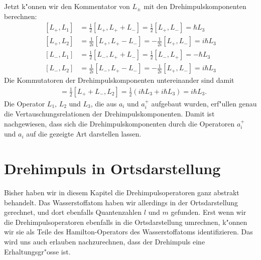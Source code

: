 Jetzt k"onnen wir den Kommentator von $L_\pm$ mit den
Drehimpulskomponenten berechnen:
\begin{align*}
[L_+,L_1]
&=
\frac12[L_+,L_++L_-]
=
\frac12[L_+,L_-]
=
\hbar L_3
\\
[L_+,L_2]
&=
\frac1{2i}[L_+,L_+-L_-]
=
-\frac1{2i}[L_+,L_-]
=
i\hbar L_3
\\
[L_-,L_1]
&=
\frac1{2}
[L_-,L_++L_-]
=
\frac12[L_-,L_+]
=
-\hbar L_3
\\
[L_-,L_2]
&=
\frac1{2i}[L_-,L_+-L_-]
=
-\frac1{2i}[L_+,L_-]
=
i\hbar L_3
\end{align*}
Die Kommutatoren der Drehimpulskomponenten untereinander sind damit
\begin{align*}
[L_1,L_2]
&=
\frac12[L_++L_-,L_2]
=
\frac12(i\hbar L_3+i\hbar L_3)
=
i\hbar L_3.
\end{align*}
Die Operator $L_1$, $L_2$ und $L_3$, die aus $a_i$ und $a_i^+$
aufgebaut wurden, erf"ullen genau die  Vertauschungsrelationen
der Drehimpulskomponenten.
Damit ist nachgewiesen, dass sich die Drehimpulskomponenten
durch die Operatoren $a_i^+$ und $a_i$ auf die gezeigte Art
darstellen lassen.

\section{Drehimpuls in Ortsdarstellung\label{section:drehimpulsortsdarstellung}}
Bisher haben wir in diesem Kapitel die Drehimpulsoperatoren ganz abstrakt
behandelt. 
Das Wasserstoffatom haben wir allerdings in der Ortsdarstellung 
gerechnet, und dort ebenfalls Quantenzahlen $l$ und $m$ gefunden.
Erst wenn wir die Drehimpulsoperatoren ebenfalls in die Ortsdarstellung
umrechnen, k"onnen wir sie als Teile des Hamilton-Operators des
Wasserstoffatoms identifizieren.
Das wird uns auch erlauben nachzurechnen, dass der Drehimpuls eine
Erhaltungsgr"osse ist.

